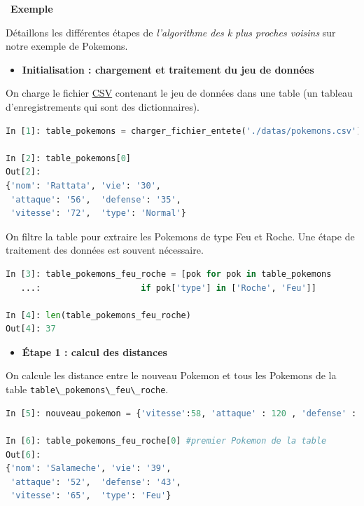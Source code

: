 \documentclass[
  11pt,
]{article}
\newcommand{\passthrough}[1]{#1}
\providecommand{\tightlist}{%
  \setlength{\itemsep}{0pt}\setlength{\parskip}{0pt}}
\newcounter{thme}
\newcounter{def}
\newcounter{exple}
\newenvironment{exemple}[1]
{\par \medskip   \addtocounter{exple}{1} \noindent  
\begin{bclogo}[arrondi =0.1,   noborder = true, logo=\bclampe, marge=4]{~\textbf{Exemple} \textbf{\theexple} {\itshape #1} }  \par}
{
\end{bclogo}
 \par \bigskip }
\newcounter{alg}
\begin{document}
\begin{exemple}{}

Détaillons les différentes étapes de \emph{l'algorithme des k plus
proches voisins} sur notre exemple de Pokemons.

\begin{itemize}
\tightlist
\item
  \textbf{Initialisation : chargement et traitement du jeu de données}
\end{itemize}

On charge le fichier
\href{https://fr.wikipedia.org/wiki/Comma-separated_values}{CSV}
contenant le jeu de données dans une table (un tableau d'enregistrements
qui sont des dictionnaires).

\begin{lstlisting}[language=Python]
In [1]: table_pokemons = charger_fichier_entete('./datas/pokemons.csv')

In [2]: table_pokemons[0]
Out[2]: 
{'nom': 'Rattata', 'vie': '30',
 'attaque': '56',  'defense': '35',
 'vitesse': '72',  'type': 'Normal'}
\end{lstlisting}

On filtre la table pour extraire les Pokemons de type Feu et Roche. Une
étape de traitement des données est souvent nécessaire.

\begin{lstlisting}[language=Python]
In [3]: table_pokemons_feu_roche = [pok for pok in table_pokemons 
   ...:                    if pok['type'] in ['Roche', 'Feu']]

In [4]: len(table_pokemons_feu_roche)
Out[4]: 37
\end{lstlisting}

\begin{itemize}
\tightlist
\item
  \textbf{Étape 1 : calcul des distances}
\end{itemize}

On calcule les distance entre le nouveau Pokemon et tous les Pokemons de
la table \passthrough{\lstinline!table\_pokemons\_feu\_roche!}.

\begin{lstlisting}[language=Python]
In [5]: nouveau_pokemon = {'vitesse':58, 'attaque' : 120 , 'defense' : 65, 'vie' : 100 }

In [6]: table_pokemons_feu_roche[0] #premier Pokemon de la table
Out[6]: 
{'nom': 'Salameche', 'vie': '39',
 'attaque': '52',  'defense': '43',
 'vitesse': '65',  'type': 'Feu'}


\end{lstlisting}
\end{exemple}
\end{document}
